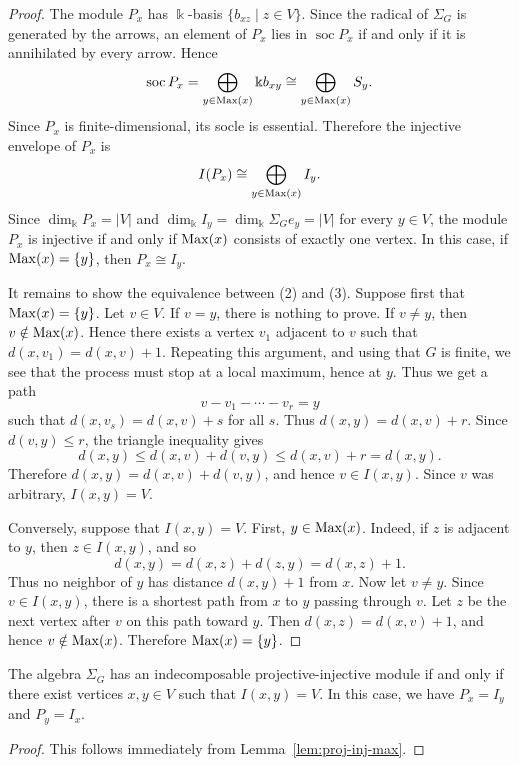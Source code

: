 \documentclass[a4paper,leqno]{amsart}
\begin{document}
\begin{proof}
The module $P_x$ has $\Bbbk$-basis $\{b_{xz}\mid z\in V\}$. Since the radical of $\Sigma_G$ is generated by the arrows, an element of $P_x$ lies in $\operatorname{soc}P_x$ if and only if it is annihilated by every arrow. Hence
\[
\operatorname{soc}P_x=
\bigoplus_{y\in \operatorname{Max}(x)}\Bbbk b_{xy}
\cong
\bigoplus_{y\in \operatorname{Max}(x)}S_y .
\]
Since $P_x$ is finite-dimensional, its socle is essential. Therefore the injective envelope of $P_x$ is
\[
I(P_x)\cong \bigoplus_{y\in \operatorname{Max}(x)} I_y .
\]
Since $\dim_{\Bbbk}P_x=|V|$ and
$\dim_{\Bbbk}I_y=\dim_{\Bbbk}\Sigma_Ge_y=|V|$ for every $y\in V$,
the module $P_x$ is injective if and only if $\operatorname{Max}(x)$ consists of exactly one vertex. In this case, if $\operatorname{Max}(x)=\{y\}$, then $P_x\cong I_y$.

It remains to show the equivalence between (2) and (3). Suppose first that
$\operatorname{Max}(x)=\{y\}$. Let $v\in V$. If $v=y$, there is nothing to prove. If $v\neq y$, then $v\notin \operatorname{Max}(x)$. Hence there exists a vertex $v_1$ adjacent to $v$ such that
$d(x,v_1)=d(x,v)+1$. Repeating this argument, and using that $G$ is finite, we see that the process must stop at a local maximum, hence at $y$. Thus we get a path
\[
v-v_1-\cdots-v_r=y
\]
such that $d(x,v_s)=d(x,v)+s$ for all $s$. Thus
$d(x,y)=d(x,v)+r$. Since $d(v,y)\leq r$, the triangle inequality gives
\[
d(x,y)\leq d(x,v)+d(v,y)\leq d(x,v)+r=d(x,y).
\]
Therefore $d(x,y)=d(x,v)+d(v,y)$, and hence $v\in I(x,y)$. Since $v$ was arbitrary, $I(x,y)=V$.

Conversely, suppose that $I(x,y)=V$. First, $y\in \operatorname{Max}(x)$. Indeed, if
$z$ is adjacent to $y$, then $z\in I(x,y)$, and so
\[
d(x,y)=d(x,z)+d(z,y)=d(x,z)+1.
\]
Thus no neighbor of $y$ has distance $d(x,y)+1$ from $x$. Now let
$v\neq y$. Since $v\in I(x,y)$, there is a shortest path from $x$ to $y$ passing through $v$. Let $z$ be the next vertex after $v$ on this path toward $y$. Then $d(x,z)=d(x,v)+1$, and hence $v\notin \operatorname{Max}(x)$. Therefore $\operatorname{Max}(x)=\{y\}$.
\end{proof}

\begin{cor}\label{cor:proj-inj-exists}
The algebra $\Sigma_G$ has an indecomposable projective-injective module if and only if there exist vertices $x,y\in V$ such that $I(x,y)=V$. In this case, we have $P_x=I_y$ and $P_y=I_x$.
\end{cor}

\begin{proof}
This follows immediately from Lemma~\ref{lem:proj-inj-max}.
\end{proof}
\end{document}

